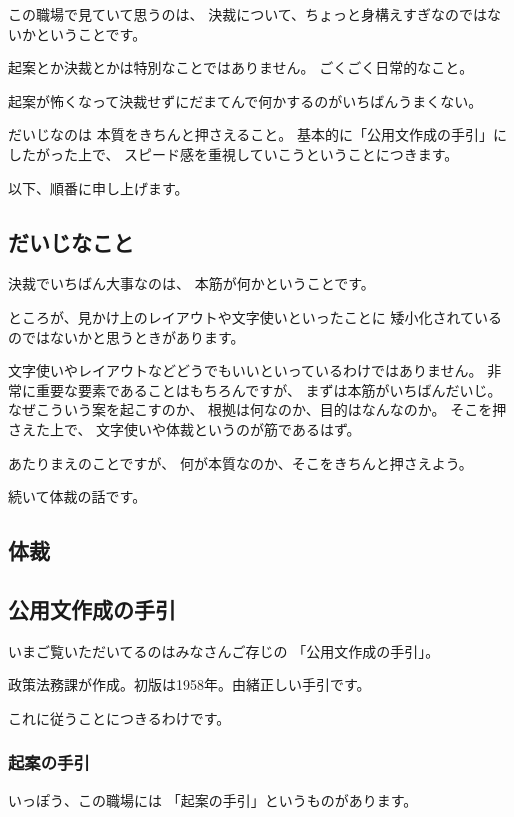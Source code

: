 \documentclass[uplatex,jis2004,dvipdfmx,12pt]{jsarticle}
\begin{document}
この職場で見ていて思うのは、
決裁について、ちょっと身構えすぎなのではないかということです。

起案とか決裁とかは特別なことではありません。
ごくごく日常的なこと。

起案が怖くなって決裁せずにだまてんで何かするのがいちばんうまくない。

だいじなのは
本質をきちんと押さえること。
基本的に「公用文作成の手引」にしたがった上で、
スピード感を重視していこうということにつきます。



以下、順番に申し上げます。

\subsection{だいじなこと}
決裁でいちばん大事なのは、
本筋が何かということです。

ところが、見かけ上のレイアウトや文字使いといったことに
矮小化されているのではないかと思うときがあります。

文字使いやレイアウトなどどうでもいいといっているわけではありません。
非常に重要な要素であることはもちろんですが、
まずは本筋がいちばんだいじ。
なぜこういう案を起こすのか、
根拠は何なのか、目的はなんなのか。
そこを押さえた上で、
文字使いや体裁というのが筋であるはず。

あたりまえのことですが、
何が本質なのか、そこをきちんと押さえよう。

続いて体裁の話です。

\subsection{体裁}
\subsection{公用文作成の手引}


いまご覧いただいてるのはみなさんご存じの
「公用文作成の手引」。

政策法務課が作成。初版は1958年。由緒正しい手引です。

これに従うことにつきるわけです。

\subsubsection{起案の手引}
いっぽう、この職場には
「起案の手引」というものがあります。
\end{document}
